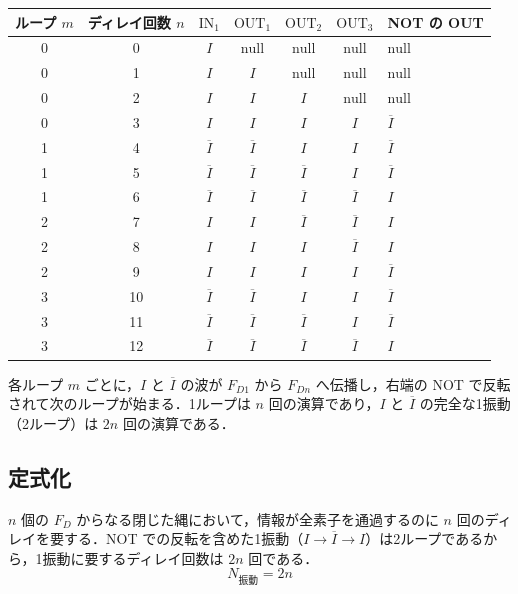 \documentclass[12pt,a4paper]{ltjsarticle}
\begin{document}
\begin{table}[htbp]
  \centering
  \begin{tabular}{ccccccl}
    \toprule
    ループ $m$ & ディレイ回数 $n$ & $\mathrm{IN}_1$ & $\mathrm{OUT}_1$ & $\mathrm{OUT}_2$ & $\mathrm{OUT}_3$ & NOT の OUT \\
    \midrule
    0 & 0 & $I$ & $\mathrm{null}$ & $\mathrm{null}$ & $\mathrm{null}$ & $\mathrm{null}$ \\
    0 & 1 & $I$ & $I$ & $\mathrm{null}$ & $\mathrm{null}$ & $\mathrm{null}$ \\
    0 & 2 & $I$ & $I$ & $I$ & $\mathrm{null}$ & $\mathrm{null}$ \\
    0 & 3 & $I$ & $I$ & $I$ & $I$ & $\overline{I}$ \\
    1 & 4 & $\overline{I}$ & $\overline{I}$ & $I$ & $I$ & $\overline{I}$ \\
    1 & 5 & $\overline{I}$ & $\overline{I}$ & $\overline{I}$ & $I$ & $\overline{I}$ \\
    1 & 6 & $\overline{I}$ & $\overline{I}$ & $\overline{I}$ & $\overline{I}$ & $I$ \\
    2 & 7 & $I$ & $I$ & $\overline{I}$ & $\overline{I}$ & $I$ \\
    2 & 8 & $I$ & $I$ & $I$ & $\overline{I}$ & $I$ \\
    2 & 9 & $I$ & $I$ & $I$ & $I$ & $\overline{I}$ \\
    3 & 10 & $\overline{I}$ & $\overline{I}$ & $I$ & $I$ & $\overline{I}$ \\
    3 & 11 & $\overline{I}$ & $\overline{I}$ & $\overline{I}$ & $I$ & $\overline{I}$ \\
    3 & 12 & $\overline{I}$ & $\overline{I}$ & $\overline{I}$ & $\overline{I}$ & $I$ \\
    \bottomrule
  \end{tabular}
\end{table}

各ループ $m$ ごとに，$I$ と $\overline{I}$ の波が $F_{D1}$ から $F_{Dn}$ へ伝播し，右端の NOT で反転されて次のループが始まる．1ループは $n$ 回の演算であり，$I$ と $\overline{I}$ の完全な1振動（2ループ）は $2n$ 回の演算である．

\subsection{定式化}

$n$ 個の $F_D$ からなる閉じた縄において，情報が全素子を通過するのに $n$ 回のディレイを要する．NOT での反転を含めた1振動（$I \to \overline{I} \to I$）は2ループであるから，1振動に要するディレイ回数は $2n$ 回である．
\begin{equation}
N_{\text{振動}} = 2n
\end{equation}
\end{document}
